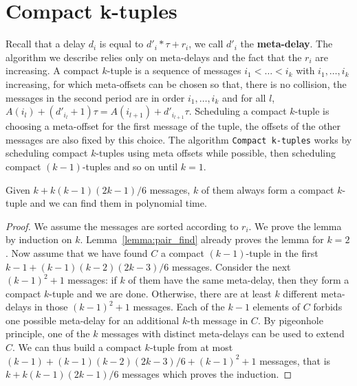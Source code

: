 \documentclass[a4paper,UKenglish,cleveref, autoref, thm-restate]{lipics-v2019}
\begin{document}
\section{Compact k-tuples}\label{sec:compact}


Recall that a delay $d_i$ is equal to  $d'_i*\tau + r_i$, we call $d'_i$ the \textbf{meta-delay}. The algorithm we describe relies only
on meta-delays and the fact that the $r_i$ are increasing.
A compact $k$-tuple is a sequence of messages $i_1 < \dots < i_k$ with $i_1,\dots,i_k$ increasing, for which meta-offsets can be chosen so that, there is no collision, the messages in the second period are in order $i_1,\dots,i_k$ and for all $l$, $A(i_l) + (d'_{i_l} + 1)\tau = A(i_{l+1}) + d'_{i_{l+1}}\tau$. Scheduling a compact $k$-tuple is choosing a meta-offset for the first message of the tuple, the offsets of the 
other messages are also fixed by this choice.  
The algorithm \texttt{Compact k-tuples} works by scheduling compact $k$-tuples
using meta offsets while possible, then scheduling compact $(k-1)$-tuples and so on until $k=1$.


\begin{lemma}\label{lemma:uple_find}
Given $k + k(k-1)(2k-1)/6$ messages, $k$ of them always form a compact $k$-tuple and we can find them in polynomial time. 
\end{lemma}
\begin{proof}
We assume the messages are sorted according to $r_i$. We prove the lemma by induction on $k$. Lemma~\ref{lemma:pair_find} already proves the lemma for $k=2$.
Now assume that we have found $C$ a compact $(k-1)$-tuple in the first $k-1 + (k-1)(k-2)(2k-3)/6$
messages. Consider the next $(k-1)^2 + 1$ messages: if $k$ of them have the same meta-delay,
then they form a compact $k$-tuple and we are done. Otherwise, there are at least $k$ different meta-delays in those $(k-1)^2 + 1$ messages. Each of the $k-1$ elements of $C$ forbids one possible meta-delay for an additional $k$-th message in $C$. By pigeonhole principle, one of the $k$ messages with distinct meta-delays can be used to extend $C$. We can thus build a compact $k$-tuple from at most $(k-1) + (k-1)(k-2)(2k-3)/6 + (k-1)^2 + 1$ messages, that is $k + k(k-1)(2k-1)/6$ messages which proves the induction.
\end{proof}
\end{document}
